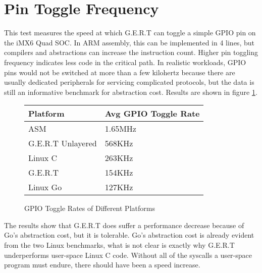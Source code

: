 
\section{Pin Toggle Frequency}\label{sec:pin_toggle}
This test measures the speed at which G.E.R.T can toggle a simple GPIO pin on
the iMX6 Quad SOC. In ARM assembly, this can be implemented in 4 lines, but compilers and 
abstractions can increase the instruction count. Higher pin
toggling frequency indicates less code in the critical path. In realistic workloads, GPIO pins
would not be switched at more than a few kilohertz because there are usually dedicated
peripherals for servicing complicated protocols, but the data is still an informative
benchmark for abstraction cost. Results are shown in figure \ref{fig:toggle}.


\begin{figure} [h]
\begin{center}
  \begin{tabular}{ | l | l |}
    \hline
    Platform & Avg GPIO Toggle Rate \\ \hline
    ASM & 1.65MHz \\ \hline
    G.E.R.T Unlayered & 568KHz \\ \hline
    Linux C & 263KHz \\ \hline
    G.E.R.T & 154KHz \\ \hline
    Linux Go & 127KHz \\
    \hline
  \end{tabular}
\end{center}
  \caption{GPIO Toggle Rates of Different Platforms}  \label{fig:toggle}
\end{figure}

The results show that G.E.R.T does suffer a performance decrease because of
Go's abstraction cost, but it is tolerable. Go's abstraction cost is already
evident from the two Linux benchmarks,
what is not clear is exactly why G.E.R.T underperforms user-space Linux C code.
Without all of the syscalls a user-space program must endure, there should have
been a speed increase.

